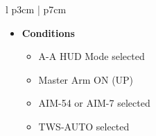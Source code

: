 \documentclass[8pt,usenames,dvipsnames,twoside]{article}
\begin{document}
\begin{center}
\begin{longtable}{l p{3cm} | p{7cm}}
\begin{minipage}[t]{\linewidth}
					\vspace{-7pt}
					\begin{itemize}
						\item \textbf{Conditions}
						\begin{itemize}
							\item A-A HUD Mode selected
							\item Master Arm ON (UP)
							\item AIM-54 or AIM-7 selected
							\item TWS-AUTO selected
						\end{itemize}
					\end{itemize}
				\end{minipage} \\
				\bottomrule
			\end{longtable}
		\end{center}
	
		\clearpage
		
\end{document}
